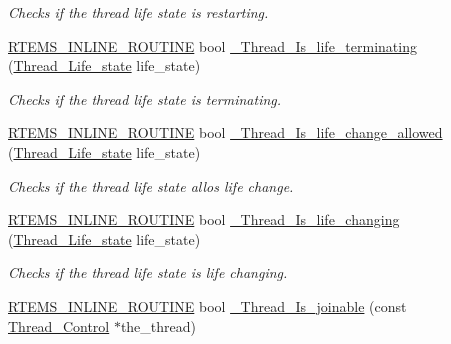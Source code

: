 \begin{DoxyCompactItemize}
\begin{DoxyCompactList}\small\item\em Checks if the thread life state is restarting. \end{DoxyCompactList}\item 
\mbox{\hyperlink{group__RTEMSScoreBaseDefs_gac216239df231d5dbd15e3520b0b9313f}{R\+T\+E\+M\+S\+\_\+\+I\+N\+L\+I\+N\+E\+\_\+\+R\+O\+U\+T\+I\+NE}} bool \mbox{\hyperlink{group__RTEMSScoreThread_gaf3103744b22d06bcb9bd69edbb62978e}{\+\_\+\+Thread\+\_\+\+Is\+\_\+life\+\_\+terminating}} (\mbox{\hyperlink{group__RTEMSScoreThread_ga0b4c61e432a0c21855e3122bb394583d}{Thread\+\_\+\+Life\+\_\+state}} life\+\_\+state)
\begin{DoxyCompactList}\small\item\em Checks if the thread life state is terminating. \end{DoxyCompactList}\item 
\mbox{\hyperlink{group__RTEMSScoreBaseDefs_gac216239df231d5dbd15e3520b0b9313f}{R\+T\+E\+M\+S\+\_\+\+I\+N\+L\+I\+N\+E\+\_\+\+R\+O\+U\+T\+I\+NE}} bool \mbox{\hyperlink{group__RTEMSScoreThread_ga7ff8c9f560a20eda908e44b5d5e47a28}{\+\_\+\+Thread\+\_\+\+Is\+\_\+life\+\_\+change\+\_\+allowed}} (\mbox{\hyperlink{group__RTEMSScoreThread_ga0b4c61e432a0c21855e3122bb394583d}{Thread\+\_\+\+Life\+\_\+state}} life\+\_\+state)
\begin{DoxyCompactList}\small\item\em Checks if the thread life state allos life change. \end{DoxyCompactList}\item 
\mbox{\hyperlink{group__RTEMSScoreBaseDefs_gac216239df231d5dbd15e3520b0b9313f}{R\+T\+E\+M\+S\+\_\+\+I\+N\+L\+I\+N\+E\+\_\+\+R\+O\+U\+T\+I\+NE}} bool \mbox{\hyperlink{group__RTEMSScoreThread_gaab5c9f0c663c9604e9491a20b8350a30}{\+\_\+\+Thread\+\_\+\+Is\+\_\+life\+\_\+changing}} (\mbox{\hyperlink{group__RTEMSScoreThread_ga0b4c61e432a0c21855e3122bb394583d}{Thread\+\_\+\+Life\+\_\+state}} life\+\_\+state)
\begin{DoxyCompactList}\small\item\em Checks if the thread life state is life changing. \end{DoxyCompactList}\item 
\mbox{\hyperlink{group__RTEMSScoreBaseDefs_gac216239df231d5dbd15e3520b0b9313f}{R\+T\+E\+M\+S\+\_\+\+I\+N\+L\+I\+N\+E\+\_\+\+R\+O\+U\+T\+I\+NE}} bool \mbox{\hyperlink{group__RTEMSScoreThread_ga7ce2f4e36ca425f2ea12da97046b9c3a}{\+\_\+\+Thread\+\_\+\+Is\+\_\+joinable}} (const \mbox{\hyperlink{struct__Thread__Control}{Thread\+\_\+\+Control}} $\ast$the\+\_\+thread)

\end{DoxyCompactItemize}
